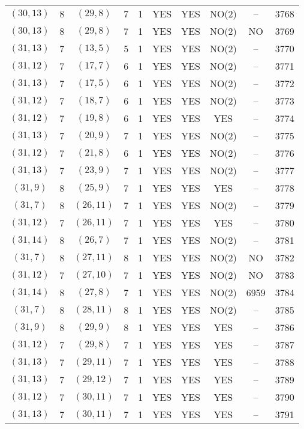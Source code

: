 \begin{longtable}{|c|c|c|c|c|c|c|c|c|c|}
$(30, 13)$ & 8 & $(29, 8)$ & 7 & 1 & YES & YES & NO(2) & -- & 3768\\
$(30, 13)$ & 8 & $(29, 8)$ & 7 & 1 & YES & YES & NO(2) & NO & 3769\\
$(31, 13)$ & 7 & $(13, 5)$ & 5 & 1 & YES & YES & NO(2) & -- & 3770\\
$(31, 12)$ & 7 & $(17, 7)$ & 6 & 1 & YES & YES & NO(2) & -- & 3771\\
$(31, 13)$ & 7 & $(17, 5)$ & 6 & 1 & YES & YES & NO(2) & -- & 3772\\
$(31, 12)$ & 7 & $(18, 7)$ & 6 & 1 & YES & YES & NO(2) & -- & 3773\\
$(31, 12)$ & 7 & $(19, 8)$ & 6 & 1 & YES & YES & YES & -- & 3774\\
$(31, 13)$ & 7 & $(20, 9)$ & 7 & 1 & YES & YES & NO(2) & -- & 3775\\
$(31, 12)$ & 7 & $(21, 8)$ & 6 & 1 & YES & YES & NO(2) & -- & 3776\\
$(31, 13)$ & 7 & $(23, 9)$ & 7 & 1 & YES & YES & NO(2) & -- & 3777\\
$(31, 9)$ & 8 & $(25, 9)$ & 7 & 1 & YES & YES & YES & -- & 3778\\
$(31, 7)$ & 8 & $(26, 11)$ & 7 & 1 & YES & YES & NO(2) & -- & 3779\\
$(31, 12)$ & 7 & $(26, 11)$ & 7 & 1 & YES & YES & YES & -- & 3780\\
$(31, 14)$ & 8 & $(26, 7)$ & 7 & 1 & YES & YES & NO(2) & -- & 3781\\
$(31, 7)$ & 8 & $(27, 11)$ & 8 & 1 & YES & YES & NO(2) & NO & 3782\\
$(31, 12)$ & 7 & $(27, 10)$ & 7 & 1 & YES & YES & NO(2) & NO & 3783\\
$(31, 14)$ & 8 & $(27, 8)$ & 7 & 1 & YES & YES & NO(2) & 6959 & 3784\\
$(31, 7)$ & 8 & $(28, 11)$ & 8 & 1 & YES & YES & NO(2) & -- & 3785\\
$(31, 9)$ & 8 & $(29, 9)$ & 8 & 1 & YES & YES & YES & -- & 3786\\
$(31, 12)$ & 7 & $(29, 8)$ & 7 & 1 & YES & YES & YES & -- & 3787\\
$(31, 13)$ & 7 & $(29, 11)$ & 7 & 1 & YES & YES & YES & -- & 3788\\
$(31, 13)$ & 7 & $(29, 12)$ & 7 & 1 & YES & YES & YES & -- & 3789\\
$(31, 12)$ & 7 & $(30, 11)$ & 7 & 1 & YES & YES & YES & -- & 3790\\
$(31, 13)$ & 7 & $(30, 11)$ & 7 & 1 & YES & YES & YES & -- & 3791\\

\end{longtable}
